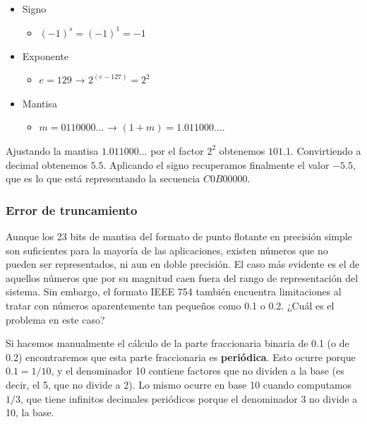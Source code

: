 \documentclass[spanish,A4,]{article}
\begin{document}
\begin{itemize}
\itemsep1pt\parskip0pt
\item
  Signo

  \begin{itemize}
  \itemsep1pt\parskip0pt
  \item
    $(-1)^s = (-1)^1 = -1$
  \end{itemize}
\item
  Exponente

  \begin{itemize}
  \itemsep1pt\parskip0pt
  \item
    $e = 129$ → $2^{(e-127)} = 2^2$
  \end{itemize}
\item
  Mantisa

  \begin{itemize}
  \itemsep1pt\parskip0pt
  \item
    $m = 0110000...$ → $(1 + m) = 1.011000....$
  \end{itemize}
\end{itemize}

Ajustando la mantisa $1.011000...$ por el factor $2^2$ obtenemos
$101.1$. Convirtiendo a decimal obtenemos $5.5$. Aplicando el signo
recuperamos finalmente el valor $-5.5$, que es lo que está representando
la secuencia $C0B00000$.

\subsubsection{Error de truncamiento}\label{error-de-truncamiento}

Aunque los 23 bits de mantisa del formato de punto flotante en precisión
simple son suficientes para la mayoría de las aplicaciones, existen
números que no pueden ser representados, ni aun en doble precisión. El
caso más evidente es el de aquellos números que por su magnitud caen
fuera del rango de representación del sistema. Sin embargo, el formato
IEEE 754 también encuentra limitaciones al tratar con números
aparentemente tan pequeños como 0.1 o 0.2. ¿Cuál es el problema en este
caso?

Si hacemos manualmente el cálculo de la parte fraccionaria binaria de
0.1 (o de 0.2) encontraremos que esta parte fraccionaria es
\textbf{periódica}. Esto ocurre porque $0.1 = 1/10$, y el denominador 10
contiene factores que no dividen a la base (es decir, el 5, que no
divide a 2). Lo mismo ocurre en base 10 cuando computamos $1/3$, que
tiene infinitos decimales periódicos porque el denominador 3 no divide a
10, la base.
\end{document}
